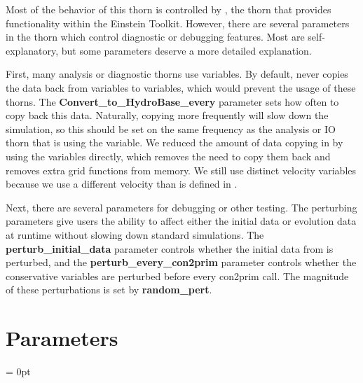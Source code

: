 \documentclass{article}
\newlength{\tableWidth} \newlength{\maxVarWidth} \newlength{\paraWidth} \newlength{\descWidth}
\begin{document}
Most of the behavior of this thorn is controlled by \glib,
the thorn that provides \grhayl{} functionality
within the Einstein Toolkit. However, there are several
parameters in the thorn which control diagnostic or debugging
features. Most are self-explanatory, but some parameters deserve
a more detailed explanation.

First, many analysis or diagnostic thorns use \hydrobase{} variables.
By default, \ghd{} never copies the data back from \ghd{} variables
to \hydrobase{} variables, which would prevent the usage of these
thorns. The \textbf{Convert\_to\_HydroBase\_every} parameter
sets how often to copy back this data. Naturally, copying more
frequently will slow down the simulation, so this should be set
on the same frequency as the analysis or IO thorn that is using
the \hydrobase{} variable. We reduced the amount of data copying in \ghd{}
by using the \hydrobase{} variables directly, which removes the need
to copy them back and removes extra grid functions from memory.
We still use distinct velocity variables because we use a different
velocity than is defined in \hydrobase.

Next, there are several parameters for debugging or other testing.
The perturbing parameters give users the ability to affect either
the initial data or evolution data at runtime without slowing down
standard simulations. The \textbf{perturb\_initial\_data} parameter
controls whether the initial data from \hydrobase{} is perturbed, and
the \textbf{perturb\_every\_con2prim} parameter controls whether
the conservative variables are perturbed before every con2prim call.
The magnitude of these perturbations is set by \textbf{random\_pert}.




\section{Parameters} 


\parskip = 0pt

\setlength{\tableWidth}{160mm}

\setlength{\paraWidth}{\tableWidth}
\setlength{\descWidth}{\tableWidth}
\settowidth{\maxVarWidth}{convert\_to\_hydrobase\_every}

\addtolength{\paraWidth}{-\maxVarWidth}
\addtolength{\paraWidth}{-\columnsep}
\addtolength{\paraWidth}{-\columnsep}
\addtolength{\paraWidth}{-\columnsep}
\end{document}
